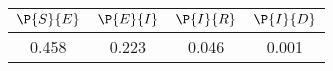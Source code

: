 \begin{tabular}{cccc}
\hline
$\P{S}{E}$&$\P{E}{I}$&$\P{I}{R}$&$\P{I}{D}$\\
\hline
0.458&0.223&0.046&0.001\\
\hline
\end{tabular}